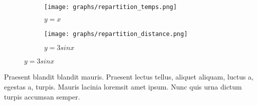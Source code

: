 \documentclass[a4paper,french,11pt]{report}
\begin{document}
\begin{figure}
     \centering
     \begin{subfigure}[b]{0.3\textwidth}
         \centering
         \texttt{[image: graphs/repartition\_temps.png]}
         \caption{$y=x$}
         \label{fig:y equals x}
     \end{subfigure}
     \hfill
     \begin{subfigure}[b]{0.3\textwidth}
         \centering
         \texttt{[image: graphs/repartition\_distance.png]}
         \caption{$y=3sinx$}
         \label{fig:three sin x}
     \end{subfigure}
     \hfill
\end{figure}

Praesent blandit blandit mauris. Praesent
lectus tellus, aliquet aliquam, luctus a, egestas a, turpis. Mauris 
lacinia loremsit amet ipsum. Nunc quis urna dictum turpis accumsan 
semper.



\end{document}
